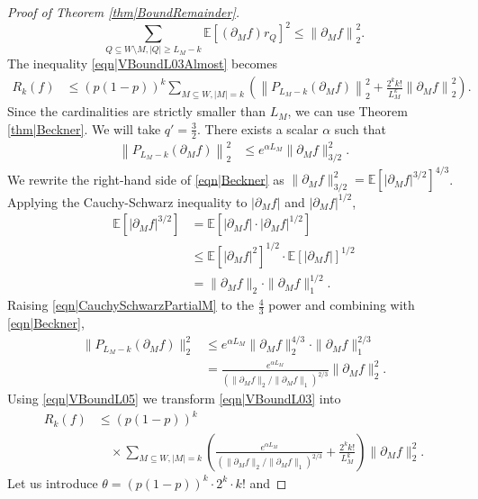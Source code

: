 \documentclass[reqno]{amsart}
\begin{document}
\begin{proof}[Proof of Theorem \ref{thm|BoundRemainder}]
\[\sum_{Q\subseteq W\setminus M, |Q|\geq L_M-k}\mathbb E\left[\left(\partial_Mf\right)r_Q\right]^2
 \leq \left\|\partial_Mf\right\|_2^2.\]
The inequality \eqref{eqn|VBoundL03Almost} becomes 
\begin{align} 
R_k(f) 
&\leq
(p(1-p))^k\sum_{M\subseteq W, |M|=k} \left(
  \left\|P_{L_M-k}(\partial_Mf)\right\|_2^2
+
\frac{2^kk!}{L_M^k}\left\|\partial_Mf\right\|_2^2
\right). \label{eqn|VBoundL03}
\end{align}
Since the cardinalities are strictly smaller than $L_M$, we can use Theorem \ref{thm|Beckner}.
We will take $q'=\frac32$. 
There exists a scalar $\alpha$ such that 
\begin{align}
  \left\|P_{L_M-k}(\partial_Mf)\right\|_2^2&\leq  e^{\alpha L_M}\|\partial_Mf\|_{3/2}^2.  \label{eqn|Beckner}
\end{align}
We rewrite the right-hand side of \eqref{eqn|Beckner} as $\|\partial_Mf\|_{3/2}^2 = \mathbb E\left[|\partial_Mf|^{3/2}\right]^{4/3}$. Applying the Cauchy-Schwarz inequality to $|\partial_Mf|$ and $|\partial_Mf|^{1/2}$,
\begin{align}
\mathbb E\left[|\partial_Mf|^{3/2}\right] &= \mathbb E\left[|\partial_Mf|\cdot |\partial_Mf|^{1/2}\right] \nonumber \\
&\leq \mathbb E\left[|\partial_Mf|^2\right]^{1/2}\cdot \mathbb E\left[|\partial_Mf|\right]^{1/2} \nonumber \\
&= \|\partial_Mf\|_2\cdot \|\partial_Mf\|_1^{1/2}. \label{eqn|CauchySchwarzPartialM}
\end{align}
Raising \eqref{eqn|CauchySchwarzPartialM} to the $\frac43$ power and combining with \eqref{eqn|Beckner},
\begin{align}
\|P_{L_M-k}(\partial_Mf)\|_2^2 &\leq  e^{\alpha L_M}\|\partial_Mf\|_2^{4/3}\cdot \|\partial_Mf\|_1^{2/3} \nonumber \\
&= \frac{e^{\alpha L_M}}{\left(\|\partial_Mf\|_2/\|\partial_Mf\|_1\right)^{2/3}}
\|\partial_Mf\|_2^2 . \label{eqn|VBoundL05}
\end{align}
Using \eqref{eqn|VBoundL05} we transform \eqref{eqn|VBoundL03} into 
\begin{align} 
R_k(f)&\leq
\left(p(1-p)\right)^k \nonumber 
\\
&\quad\times\sum_{M\subseteq W, |M|=k}
\left(\frac{e^{\alpha L_M}}{\left(\|\partial_Mf\|_2/\|\partial_Mf\|_1\right)^{2/3}}
+\frac{2^kk!}{L_M^k}\right)
\|\partial_Mf\|_2^2.
\label{eqn|VBoundL07Unfinished}
\end{align}
Let us introduce $ \theta=\left(p(1-p)\right)^k\cdot 2^k\cdot k!$ and 

\end{proof}
\end{document}
